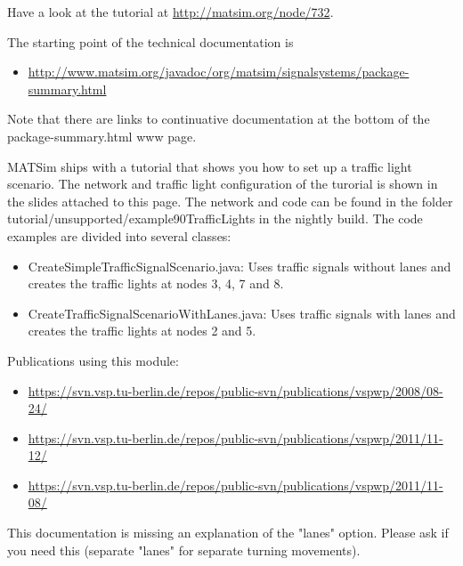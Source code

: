 Have a look at the tutorial at \href{http://matsim.org/node/732}{http://matsim.org/node/732}.

The starting point of the technical documentation is
\begin{itemize}
	\item \href{http://www.matsim.org/javadoc/org/matsim/signalsystems/package-summary.html}{http://www.matsim.org/javadoc/org/matsim/signalsystems/package-summary.html}
\end{itemize}

Note that there are links to continuative documentation at the bottom of the package-summary.html www page.

MATSim ships with a tutorial that shows you how to set up a traffic  light scenario. The network and traffic light configuration of the  turorial is shown in the slides attached to this page. The network and  code can be found in the folder  tutorial/unsupported/example90TrafficLights in the nightly build. The  code examples are divided into several classes:
\begin{itemize}
	\item CreateSimpleTrafficSignalScenario.java: Uses traffic signals  without lanes and creates the traffic lights at nodes 3, 4, 7 and 8.
	\item CreateTrafficSignalScenarioWithLanes.java: Uses traffic signals with lanes and creates the traffic lights at nodes 2 and 5.
\end{itemize}



Publications using this module:
\begin{itemize}
	\item \href{https://svn.vsp.tu-berlin.de/repos/public-svn/publications/vspwp/2008/08-24/}{https://svn.vsp.tu-berlin.de/repos/public-svn/publications/vspwp/2008/08-24/}
	\item \href{https://svn.vsp.tu-berlin.de/repos/public-svn/publications/vspwp/2011/11-12/}{https://svn.vsp.tu-berlin.de/repos/public-svn/publications/vspwp/2011/11-12/}
	\item \href{https://svn.vsp.tu-berlin.de/repos/public-svn/publications/vspwp/2011/11-08/}{https://svn.vsp.tu-berlin.de/repos/public-svn/publications/vspwp/2011/11-08/}
\end{itemize}This documentation is missing an  explanation of the "lanes" option. Please ask if you need this  (separate "lanes" for separate turning movements).




